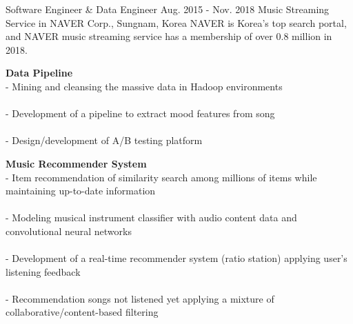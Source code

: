 \begin{cventries}
    \cventry
        {Software Engineer \& Data Engineer} %
        {Aug. 2015 - Nov. 2018} %
        {Music Streaming Service in NAVER Corp., } %
        {Sungnam, Korea}%
        { %
            NAVER is Korea's top search portal, and NAVER music streaming service has a membership of over 0.8 million in 2018.
        }
        { %
            \begin{cvitems}
                \item {
                    {\bf Data Pipeline} \\
                    - Mining and cleansing the massive data in Hadoop environments \\
                         \\
                    - Development of a pipeline to extract mood features from song \\
                         \\
                    - Design/development of A/B testing platform 
                         \nn
                }
                \item {
                    {\bf Music Recommender System} \\
                    - Item recommendation of similarity search among millions of items while maintaining up-to-date information \\
                         \\
                    - Modeling musical instrument classifier with audio content data and convolutional neural networks \\
                         \\
                    - Development of a real-time recommender system (ratio station) applying user's listening feedback \\
                         \\
                    - Recommendation songs not listened yet applying a mixture of collaborative/content-based filtering \\
                         \nn
                }
            \end{cvitems}
        }
\end{cventries}